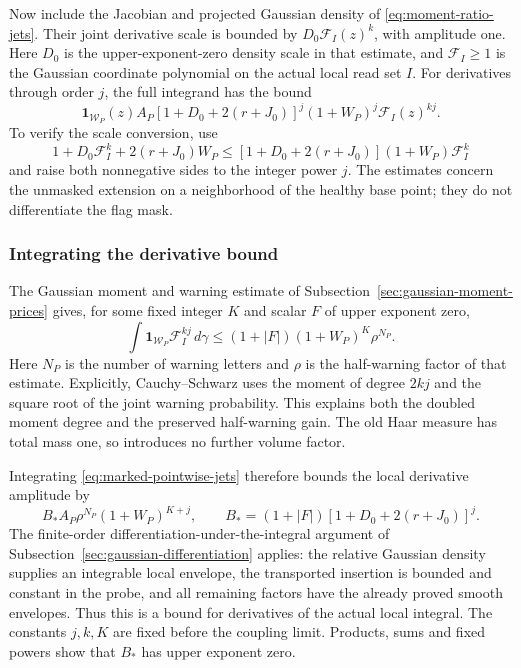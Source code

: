 Now include the Jacobian and projected Gaussian density of
\eqref{eq:moment-ratio-jets}. Their joint derivative
scale is bounded by $D_0\mathcal F_I(z)^k$, with amplitude one.
Here $D_0$ is the upper-exponent-zero density scale in that estimate,
and $\mathcal F_I\ge1$ is the Gaussian coordinate polynomial
on the actual local read set $I$. For derivatives through order
$j$, the full integrand has the bound
\begin{equation}\label{eq:marked-pointwise-jets}
 \mathbf1_{\mathcal W_P}(z) A_P
       [1+D_0+2(r+J_0)]^j(1+W_P)^j\mathcal F_I(z)^{kj}.
\end{equation}
To verify the scale conversion, use
\[
 1+D_0\mathcal F_I^k+2(r+J_0)W_P
 \le[1+D_0+2(r+J_0)](1+W_P)\mathcal F_I^k
\]
and raise both nonnegative sides to the integer power $j$.
The estimates concern the unmasked extension on a neighborhood
of the healthy base point; they do not differentiate the flag mask.

\subsubsection{Integrating the derivative bound}
The Gaussian moment and warning estimate of
Subsection~\ref{sec:gaussian-moment-prices} gives, for some fixed
integer $K$ and scalar $F$ of upper exponent zero,
\[
 \int\mathbf1_{\mathcal W_P}\mathcal F_I^{kj}\,d\gamma
          \le (1+|F|)(1+W_P)^K\rho^{N_P}.
\]
Here $N_P$ is the number of warning letters and $\rho$ is the
half-warning factor of that estimate. Explicitly, Cauchy--Schwarz
uses the moment of degree $2kj$ and the square root of the joint
warning probability. This explains both the doubled moment degree
and the preserved half-warning gain. The old Haar measure has total
mass one, so introduces no further volume factor.

Integrating \eqref{eq:marked-pointwise-jets} therefore bounds the
local derivative amplitude by
\begin{equation}\label{eq:marked-integral-jets}
 B_* A_P\rho^{N_P}(1+W_P)^{K+j},\qquad
 B_*=(1+|F|)[1+D_0+2(r+J_0)]^j.
\end{equation}
The finite-order differentiation-under-the-integral argument of
Subsection~\ref{sec:gaussian-differentiation} applies: the relative
Gaussian density supplies an integrable local envelope, the
transported insertion is bounded and constant in the probe, and
all remaining factors have the already proved smooth envelopes.
Thus this is a bound for derivatives of the actual local integral.
The constants $j,k,K$ are fixed before the coupling limit. Products,
sums and fixed powers show that $B_*$ has upper exponent zero.

